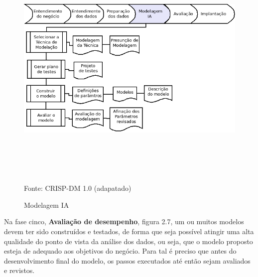 \begin{figure}[!ht]
\centering
\caption{Modelagem IA}
\vspace{1mm}
\includegraphics[width=160mm, height=120mm]{Figuras/Cronograma/Model_IA.png}\\
\tiny Fonte: CRISP-DM 1.0 (adapatado)
\end{figure}

\pagebreak

Na fase cinco, \textbf{Avaliação de desempenho}, figura 2.7, um ou muitos modelos devem ter sido construídos e testados, 
de forma que seja possível atingir uma alta qualidade do ponto de vista da análise dos dados, ou seja, que o 
modelo proposto esteja de adequado aos objetivos do negócio. Para tal é preciso que antes do desenvolvimento final 
do modelo, os passos executados até então sejam avaliados e revistos.

\vspace{0.5cm}

